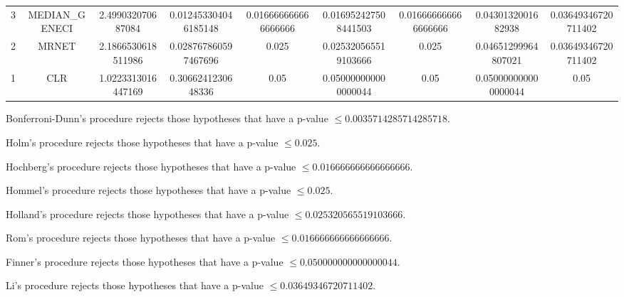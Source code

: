 \documentclass[a4paper,10pt]{article}
\begin{document}
\begin{landscape}
\begin{table}[!htp]
\begin{tabular}{ccccccccc}
3&MEDIAN_GENECI&2.499032070687084&0.012453304046185148&0.016666666666666666&0.016952427508441503&0.016666666666666666&0.0430132001682938&0.03649346720711402\\
2&MRNET&2.1866530618511986&0.028767860597467696&0.025&0.025320565519103666&0.025&0.04651299964807021&0.03649346720711402\\
1&CLR&1.0223313016447169&0.3066241230648336&0.05&0.050000000000000044&0.05&0.050000000000000044&0.05\\
\hline
\end{tabular}
\end{table}
Bonferroni-Dunn's procedure rejects those hypotheses that have a p-value $\le0.0035714285714285718$.


Holm's procedure rejects those hypotheses that have a p-value $\le0.025$.


Hochberg's procedure rejects those hypotheses that have a p-value $\le0.016666666666666666$.


Hommel's procedure rejects those hypotheses that have a p-value $\le0.025$.


Holland's procedure rejects those hypotheses that have a p-value $\le0.025320565519103666$.


Rom's procedure rejects those hypotheses that have a p-value $\le0.016666666666666666$.


Finner's procedure rejects those hypotheses that have a p-value $\le0.050000000000000044$.


Li's procedure rejects those hypotheses that have a p-value $\le0.03649346720711402$.



\newpage


\end{landscape}
\end{document}
